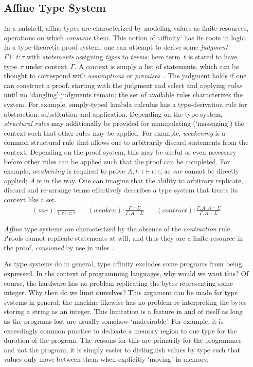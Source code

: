 \subsection{Affine Type System}
In a nutshell, affine types are characterized by modeling values as finite resources, operations on which \textit{consume} them. This notion of `affinity' has its roots in logic. In a type-theoretic proof system, one can attempt to derive some \textit{judgment} $\Gamma\vdash{}t:\tau$ with \textit{statements} assigning \textit{types} to \textit{terms}; here term~$t$ is stated to have type~$\tau$ under context~$\Gamma$. A context is simply a list of statements, which can be thought to correspond with \textit{assumptions} or \textit{premises}~\cite{nederpelt2014type}. The judgment holds if one can construct a proof, starting with the judgment and select and applying \textit{rules} until no `dangling' judgments remain; the set of available rules characterizes the system. For example, simply-typed lambda calculus has a type-derivation rule for abstraction, substitution and application. Depending on the type system, \textit{structural rules} may additionally be provided for manipulating (`massaging') the context such that other rules may be applied. For example, \textit{weakening} is a common structural rule that allows one to arbitrarily discard statements from the context. Depending on the proof system, this may be useful or even necessary before other rules can be applied such that the proof can be completed. For example, $weakening$ is required to prove $A, t:\tau\vdash t:\tau$, as $var$ cannot be directly applied; $A$ is in the way. One can imagine that the ability to arbitrary replicate, discard and re-arrange terms effectively describes a type system that treats its context like a set.
\[
\begin{aligned}
(var): \frac{}{t:\tau \vdash t: \tau}
&\quad
(weaken): \frac{\Gamma \vdash \Sigma}{\Gamma, A \vdash \Sigma}
&\quad
(contract): \frac{\Gamma, A, A \vdash \Sigma}{\Gamma, A \vdash \Sigma}
\end{aligned}
\]

\textit{Affine} type systems are characterized by the absence of the \textit{contraction} rule. Proofs cannot replicate statements at will, and thus they are a finite resource in the proof, \textit{consumed} by use in rules~\cite{walker2005substructural}.

As type systems do in general, type affinity excludes some programs from being expressed. In the context of programming languages, why would we want this? Of course, the hardware has no problem replicating the bytes representing some integer. Why then do we limit ourselves? This argument can be made for type systems in general; the machine likewise has no problem re-interpreting the bytes storing a string as an integer. This limitation is a feature in and of itself as long as the programs lost are usually somehow `undesirable'. For example, it is exceedingly common practice to dedicate a memory region to one type for the duration of the program. The reasons for this are primarily for the programmer and not the program; it is simply easier to distinguish values by type such that values only move between them when explicitly `moving' in memory.


